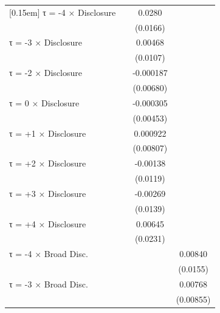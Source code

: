 \begin{table}[htbp]
\begin{tabular}{l*{3}{c}}
[0.15em]
τ = -4 × Disclosure &                     &      0.0280\sym{*}  &                     \\
                    &                     &    (0.0166)         &                     \\
[0.15em]
τ = -3 × Disclosure &                     &     0.00468         &                     \\
                    &                     &    (0.0107)         &                     \\
[0.15em]
τ = -2 × Disclosure &                     &   -0.000187         &                     \\
                    &                     &   (0.00680)         &                     \\
[0.15em]
τ = 0 × Disclosure  &                     &   -0.000305         &                     \\
                    &                     &   (0.00453)         &                     \\
[0.15em]
τ = +1 × Disclosure &                     &    0.000922         &                     \\
                    &                     &   (0.00807)         &                     \\
[0.15em]
τ = +2 × Disclosure &                     &    -0.00138         &                     \\
                    &                     &    (0.0119)         &                     \\
[0.15em]
τ = +3 × Disclosure &                     &    -0.00269         &                     \\
                    &                     &    (0.0139)         &                     \\
[0.15em]
τ = +4 × Disclosure &                     &     0.00645         &                     \\
                    &                     &    (0.0231)         &                     \\
[0.15em]
τ = -4 × Broad Disc.&                     &                     &     0.00840         \\
                    &                     &                     &    (0.0155)         \\
[0.15em]
τ = -3 × Broad Disc.&                     &                     &     0.00768         \\
                    &                     &                     &   (0.00855)         \\

\end{tabular}
\end{table}

